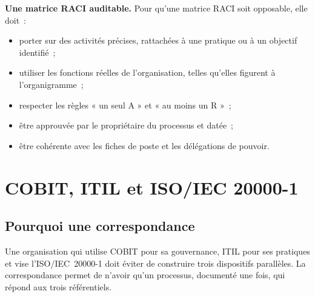\begin{boxprocedure}
\textbf{Une matrice RACI auditable.} Pour qu'une matrice RACI soit
opposable, elle doit~:
\begin{itemize}
    \item porter sur des activités précises, rattachées à une pratique ou à
          un objectif identifié~;
    \item utiliser les fonctions réelles de l'organisation, telles qu'elles
          figurent à l'organigramme~;
    \item respecter les règles « un seul A » et « au moins un R »~;
    \item être approuvée par le propriétaire du processus et datée~;
    \item être cohérente avec les fiches de poste et les délégations de
          pouvoir.
\end{itemize}
\end{boxprocedure}

\section{COBIT, ITIL et ISO/IEC 20000-1}
\label{sec:c16-correspondance}

\subsection{Pourquoi une correspondance}

Une organisation qui utilise COBIT pour sa gouvernance, ITIL pour ses
pratiques et vise l'ISO/IEC~20000-1 doit éviter de construire trois
dispositifs parallèles. La correspondance permet de n'avoir qu'un
processus, documenté une fois, qui répond aux trois référentiels.

